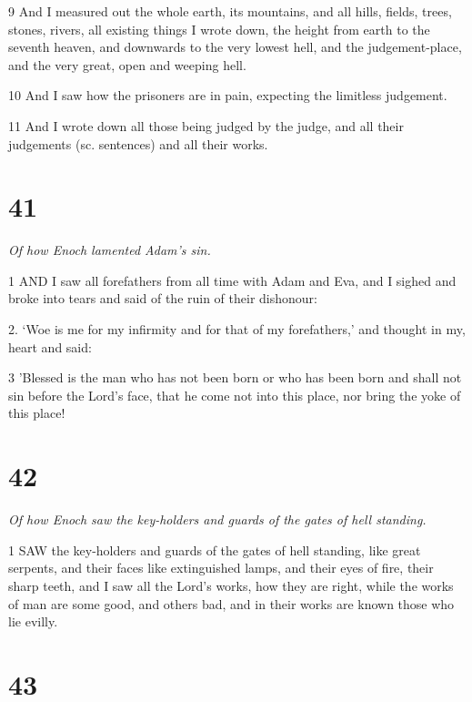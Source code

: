 \par 9 And I measured out the whole earth, its mountains, and all hills, fields, trees, stones, rivers, all existing things I wrote down, the height from earth to the seventh heaven, and downwards to the very lowest hell, and the judgement-place, and the very great, open and weeping hell.

\par 10 And I saw how the prisoners are in pain, expecting the limitless judgement.

\par 11 And I wrote down all those being judged by the judge, and all their judgements (sc. sentences) and all their works.

\chapter{41}

\par \textit{Of how Enoch lamented Adam's sin.}

\par 1 AND I saw all forefathers from all time with Adam and Eva, and I sighed and broke into tears and said of the ruin of their dishonour:

\par 2. ‘Woe is me for my infirmity and for that of my forefathers,’ and thought in my, heart and said:

\par 3 'Blessed is the man who has not been born or who has been born and shall not sin before the Lord's face, that he come not into this place, nor bring the yoke of this place!

\chapter{42}

\par \textit{Of how Enoch saw the key-holders and guards of the gates of hell standing.}

\par 1 SAW the key-holders and guards of the gates of hell standing, like great serpents, and their faces like extinguished lamps, and their eyes of fire, their sharp teeth, and I saw all the Lord's works, how they are right, while the works of man are some good, and others bad, and in their works are known those who lie evilly.

\chapter{43}

